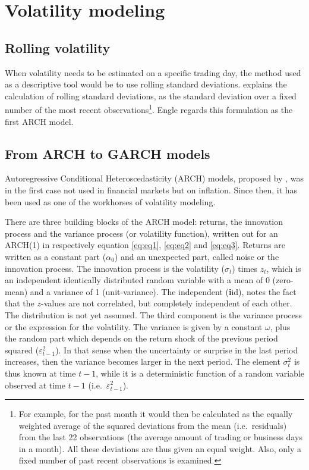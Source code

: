 \documentclass[a4paper, twoside]{templates/ociamthesis}
\begin{document}
\newpage

\hypertarget{vol-mod}{%
\section{Volatility modeling}\label{vol-mod}}

\hypertarget{rolling-volatility}{%
\subsection{Rolling volatility}\label{rolling-volatility}}

\noindent When volatility needs to be estimated on a specific trading day, the method used as a descriptive tool would be to use rolling standard deviations. \textcite{engle2001} explains the calculation of rolling standard deviations, as the standard deviation over a fixed number of the most recent observations\footnote{For example, for the past month it would then be calculated as the equally weighted average of the squared deviations from the mean (i.e.~residuals) from the last 22 observations (the average amount of trading or business days in a month). All these deviations are thus given an equal weight. Also, only a fixed number of past recent observations is examined.}. Engle regards this formulation as the first ARCH model.

\hypertarget{univ-garch}{%
\subsection{From ARCH to GARCH models}\label{univ-garch}}

\noindent Autoregressive Conditional Heteroscedasticity (ARCH) models, proposed by \textcite{engle1982}, was in the first case not used in financial markets but on inflation. Since then, it has been used as one of the workhorses of volatility modeling.

There are three building blocks of the ARCH model: returns, the innovation process and the variance process (or volatility function), written out for an ARCH(1) in respectively equation \eqref{eq:eq1}, \eqref{eq:eq2} and \eqref{eq:eq3}. Returns are written as a constant part (\(\alpha_0\)) and an unexpected part, called noise or the innovation process. The innovation process is the volatility (\(\sigma_t\)) times \(z_t\), which is an independent identically distributed random variable with a mean of 0 (zero-mean) and a variance of 1 (unit-variance). The independent (\textbf{i}id), notes the fact that the \(z\)-values are not correlated, but completely independent of each other. The distribution is not yet assumed. The third component is the variance process or the expression for the volatility. The variance is given by a constant \(\omega\), plus the random part which depends on the return shock of the previous period squared (\(\varepsilon_{t-1}^2\)). In that sense when the uncertainty or surprise in the last period increases, then the variance becomes larger in the next period. The element \(\sigma_t^2\) is thus known at time \(t-1\), while it is a deterministic function of a random variable observed at time \(t-1\) (i.e.~\(\varepsilon_{t-1}^2\)).
\end{document}
